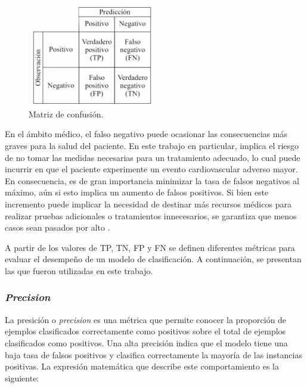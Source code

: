 \begin{figure}[h!]
	\centering
	\includegraphics[width=0.5\textwidth]{./Figures/MatrizConfusion.jpg}
	\caption{Matriz de confusión\protect\footnotemark.}\label{fig:MatrizConfusion}
\end{figure}


En el ámbito médico, el falso negativo puede ocasionar las consecuencias más graves para la salud del 
paciente. En este trabajo en particular, implica el riesgo de no tomar las medidas necesarias para un 
tratamiento adecuado, lo cual puede incurrir en que el paciente experimente un evento cardiovascular 
adverso mayor. En consecuencia, es de gran importancia minimizar la tasa de falsos negativos al máximo, 
aún si esto implica un aumento de falsos positivos. Si bien este incremento puede implicar la necesidad de 
destinar más recursos médicos para realizar pruebas adicionales o tratamientos innecesarios, se garantiza 
que menos casos sean pasados por alto \citep{CITE:40}.

\filbreak


A partir de los valores de TP, TN, FP y FN se definen diferentes métricas para evaluar el desempeño de 
un modelo de clasificación. A continuación, se presentan las que fueron utilizadas en este trabajo.

\subsubsection{\emph{Precision}}
La presición o \emph{precision} es una métrica que permite conocer la proporción de ejemplos clasificados 
correctamente como positivos sobre el total de ejemplos clasificados como positivos. Una alta precisión 
indica que el modelo tiene una baja tasa de falsos positivos y clasifica correctamente la mayoría de las 
instancias positivas. La expresión matemática que describe este comportamiento es la siguiente:

